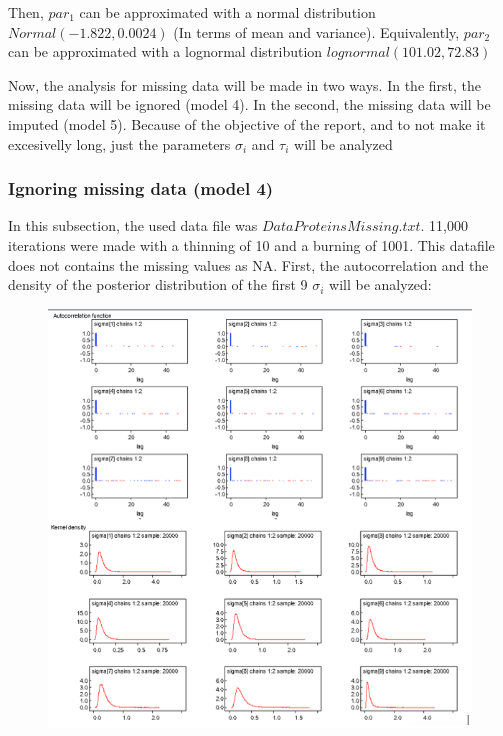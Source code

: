 \documentclass{article}
\begin{document}
Then, $par_1$ can be approximated with a normal distribution $Normal(-1.822, 0.0024)$ (In terms of mean and variance). Equivalently, $par_2$ can be approximated with a lognormal distribution $lognormal(101.02, 72.83)$

Now, the analysis for missing data will be made in two ways. In the first, the missing data will be ignored (model 4). In the second, the missing data will be imputed (model 5). Because of the objective of the report, and to not make it excesivelly long, just the parameters $\sigma_i$ and $\tau_i$ will be analyzed

\newpage
\subsubsection*{Ignoring missing data (model 4) }

In this subsection, the used data file was $DataProteinsMissing.txt$. 11,000 iterations were made with a thinning of 10 and a burning of 1001. This datafile does not contains the missing values as NA. First, the autocorrelation and the density of the posterior distribution of the first 9 $\sigma_i$ will be analyzed:

\begin{figure}[ht!]
\centering
\includegraphics[width=16cm]{figures/model4_sigma.png}
\end{figure}
\end{document}
